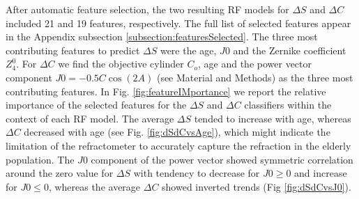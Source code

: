 \documentclass[article,twocolumn,preprint,10pt]{paper}%
\renewcommand{\(}{\left(}
\renewcommand{\)}{\right)}
\renewcommand{\[}{\left[}
\renewcommand{\]}{\right]}
\newcommand{\1}{\mbox{\boldmath$1$}}
\begin{document}
	After automatic feature selection, the two resulting RF models for $\Delta S$ and $\Delta C$ included 21 and 19 features, respectively. The full list of selected features appear in the Appendix subsection \ref{subsection:featuresSelected}. The three most contributing features to predict $\Delta S$ were the age, $J0$ and the Zernike coefficient $Z_4^0$. For $\Delta C$ we find the objective cylinder $C_o$, age and the power vector component $J0=-0.5C\cos(2A)$ (see Material and Methods) as the three most contributing features. In Fig. \ref{fig:featureIMportance}  we report the relative importance of the selected features for the $\Delta S$ and $\Delta C$ classifiers within the context of each RF model. The average $\Delta S$ tended to increase with age, whereas $\Delta C$ decreased with age (see Fig. \ref{fig:dSdCvsAge}), which might indicate the limitation of the refractometer to accurately capture the refraction in the elderly population. The $J0$ component of the power vector showed symmetric correlation around the zero value for $\Delta S$ with tendency to decrease for $J0\geq 0$ and increase for $J0\leq0$, whereas the average $\Delta C$ showed inverted trends (Fig \ref{fig:dSdCvsJ0}).
\end{document}
